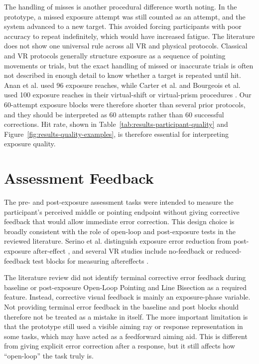 The handling of misses is another procedural difference worth noting. In the prototype, a missed exposure attempt was still counted as an attempt, and the system advanced to a new target. This avoided forcing participants with poor accuracy to repeat indefinitely, which would have increased fatigue. The literature does not show one universal rule across all VR and physical protocols. Classical and VR protocols generally structure exposure as a sequence of pointing movements or trials, but the exact handling of missed or inaccurate trials is often not described in enough detail to know whether a target is repeated until hit. Anan et al. used 96 exposure reaches, while Carter et al. and Bourgeois et al. used 100 exposure reaches in their virtual-shift or virtual-prism procedures \cite{anan2025comparative,Carter2016,Bourgeois2021}. Our 60-attempt exposure blocks were therefore shorter than several prior protocols, and they should be interpreted as 60 attempts rather than 60 successful corrections. Hit rate, shown in Table~\ref{tab:results-participant-quality} and Figure~\ref{fig:results-quality-examples}, is therefore essential for interpreting exposure quality.

\section{Assessment Feedback}
\label{sec:discussion-assessment-feedback}

The pre- and post-exposure assessment tasks were intended to measure the participant's perceived middle or pointing endpoint without giving corrective feedback that would allow immediate error correction. This design choice is broadly consistent with the role of open-loop and post-exposure tests in the reviewed literature. Serino et al. distinguish exposure error reduction from post-exposure after-effect \cite{serino2006mechanisms}, and several VR studies include no-feedback or reduced-feedback test blocks for measuring aftereffects \cite{Gammeri2020,gerken2025sense}.

The literature review did not identify terminal corrective error feedback during baseline or post-exposure Open-Loop Pointing and Line Bisection as a required feature. Instead, corrective visual feedback is mainly an exposure-phase variable. Not providing terminal error feedback in the baseline and post blocks should therefore not be treated as a mistake in itself. The more important limitation is that the prototype still used a visible aiming ray or response representation in some tasks, which may have acted as a feedforward aiming aid. This is different from giving explicit error correction after a response, but it still affects how ``open-loop'' the task truly is.

